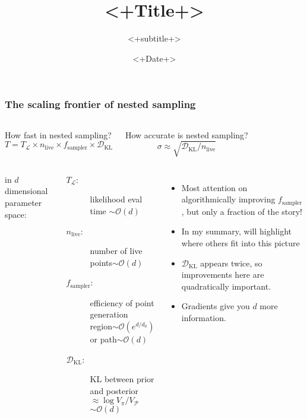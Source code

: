 \documentclass[aspectratio=169]{beamer}
\title{<+Title+>}
\subtitle{<+subtitle+>}
\date{<+Date+>}
\begin{document}
\begin{frame}
    \frametitle{The scaling frontier of nested sampling}
    \begin{columns}[t]
        \begin{block}{How fast in nested sampling?}
            \[ \boxed{T = T_\mathcal{L} \times n_\mathrm{live} \times f_\mathrm{sampler} \times \mathcal{D}_\mathrm{KL}} \]
        \end{block}
        \begin{block}{How accurate is nested sampling?}
            \[ \boxed{\sigma \approx \sqrt{\mathcal{D}_\mathrm{KL}/n_\mathrm{live}}} \]
        \end{block}
    \end{columns}
    \vspace{10pt}
    \begin{columns}
        in $d$ dimensional parameter space:
        \begin{description}
            \item[$T_\mathcal{L}$:] likelihood eval time \hfill$\sim\mathcal{O}(d)$
            \item[$n_\mathrm{live}$:] number of live points\hfill$\sim\mathcal{O}(d)$
            \item[$f_\mathrm{sampler}$:] efficiency of point generation \\ region$\sim\mathcal{O}(e^{d/d_0})$ or path$\sim\mathcal{O}(d)$
            \item[$\mathcal{D}_\mathrm{KL}$:] KL between prior and posterior $\approx\log{V_\pi}/{V_\mathcal{P}}$ \hfill$\sim\mathcal{O}(d)$
        \end{description}
        \begin{itemize}
            \item Most attention on algorithmically improving $f_\mathrm{sampler}$, but only a fraction of the story!
            \item In my summary, will highlight where others fit into this picture
            \item $\mathcal{D}_\mathrm{KL}$ appears twice, so improvements here are quadratically important.
            \item Gradients give you $d$ more information.
        \end{itemize}
    \end{columns}

\end{frame}
\end{document}

